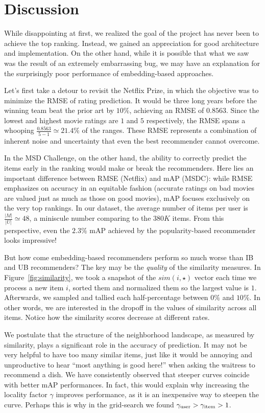 \documentclass[conference]{IEEEtran}
\newcommand{\mAP}{m\textsc{AP} }
\begin{document}
\section{Discussion}

While disappointing at first, we realized the goal of
the project has never been to achieve the top ranking. Instead, we gained
an appreciation for good architecture and implementation. 
On the other hand,
while it is possible that what we saw was the result of an extremely
embarrassing bug, we may have an explanation for 
the surprisingly poor performance
of embedding-based approaches.

Let's first take a detour to
revisit the Netflix Prize, in which the objective was to
minimize the RMSE of rating prediction. It would be three long years before
the winning team beat the prior art by $10\%$, achieving an RMSE of $0.8563$.
Since the lowest and highest movie ratings are $1$ and $5$ respectively,
the RMSE spans a whooping $\frac{0.8563}{5-1} \simeq 21.4\%$ of the ranges.
These RMSE represents a combination of inherent noise and uncertainty
that even the best recommender cannot overcome.

In the MSD Challenge, on the other hand,
the ability to correctly predict the items early
in the ranking would make or break the recommenders. Here lies an
important difference between RMSE (Netflix) and \mAP (MSDC): while RMSE
emphasizes on accuracy in an equitable fashion (accurate ratings on bad
movies are valued just as much as those on good movies),
\mAP focuses exclusively on
the very top rankings. In our dataset, the average number of items per user is
$\frac{|M|}{|U|} \simeq 48$, a miniscule number comparing to the $380K$
items. From this perspective, even the $2.3\%$ \mAP achieved by
the popularity-based recommender looks impressive!

But how come embedding-based recommenders perform so much worse
than IB and UB recommenders? The key may be the {\em quality} of the
similarity measures. In Figure~\ref{fig:similarity}, we took a snapshot of the
$sim(i,\star)$ vector each time we process a new item $i$, sorted them and
normalized them so the largest value is $1$. Afterwards, we sampled and
tallied each half-percentage between $0\%$ and $10\%$. In other words, we
are interested in the dropoff in the values of similarity across
all items. Notice how the similarity scores decrease at different rates.

We postulate that the structure of the neighborhood landscape, as measured
by similarity, plays a significant role in the accuracy of prediction.
It may not be very helpful to have too many similar items, just like it would
be annoying and unproductive to hear ``most anything is good here!'' when
asking the waitress to recommend a dish.
We have consistently observed that steeper curves
coincide with better \mAP performances. In fact, this would explain why
increasing the locality factor $\gamma$ improves performance, as
it is an inexpensive way to steepen the curve.
Perhaps this is why in the grid-search we found
$\gamma_{\rm user} > \gamma_{\rm item} > 1$.
\end{document}
